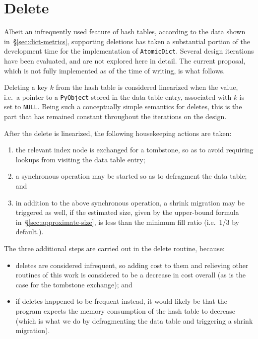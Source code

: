 \section{Delete}\label{sec:delete}

Albeit an infrequently used feature of hash tables, according to the data shown in~\S\ref{sec:dict-metrics}, supporting deletions has taken a substantial portion of the development time for the implementation of \texttt{AtomicDict}.
Several design iterations have been evaluated, and are not explored here in detail.
The current proposal, which is not fully implemented as of the time of writing, is what follows.

Deleting a key $k$ from the hash table is considered linearized when the value, i.e.\ a pointer to a \texttt{PyObject} stored in the data table entry, associated with $k$ is set to \texttt{NULL}.
Being such a conceptually simple semantics for deletes, this is the part that has remained constant throughout the iterations on the design.

After the delete is linearized, the following housekeeping actions are taken:
\begin{enumerate}
    \item the relevant index node is exchanged for a tombstone, so as to avoid requiring lookups from visiting the data table entry;
    \item a synchronous operation may be started so as to defragment the data table; and
    \item in addition to the above synchronous operation, a shrink migration may be triggered as well, if the estimated size, given by the upper-bound formula in~\S\ref{sec:approximate-size}, is less than the minimum fill ratio (i.e.\ 1/3 by default.).
\end{enumerate}

The three additional steps are carried out in the delete routine, because:
\begin{itemize}
    \item deletes are considered infrequent, so adding cost to them and relieving other routines of this work is considered to be a decrease in cost overall (as is the case for the tombstone exchange); and
    \item if deletes happened to be frequent instead, it would likely be that the program expects the memory consumption of the hash table to decrease (which is what we do by defragmenting the data table and triggering a shrink migration).
\end{itemize}

